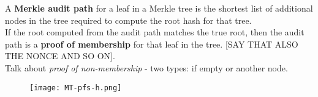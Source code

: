 
A {\bf Merkle audit path} for a leaf in a Merkle tree is the shortest list of additional nodes in the tree required to compute the root hash for that tree.\\

If the root computed from the audit path matches the true root, then the audit path is a {\bf proof of membership} for that leaf in the tree. [SAY THAT ALSO THE NONCE AND SO ON].\\

Talk about {\it proof of non-membership} - two types: if empty or another node.\\

\begin{figure}[h]
	\centering
	  \texttt{[image: MT-pfs-h.png]} 
\end{figure}




